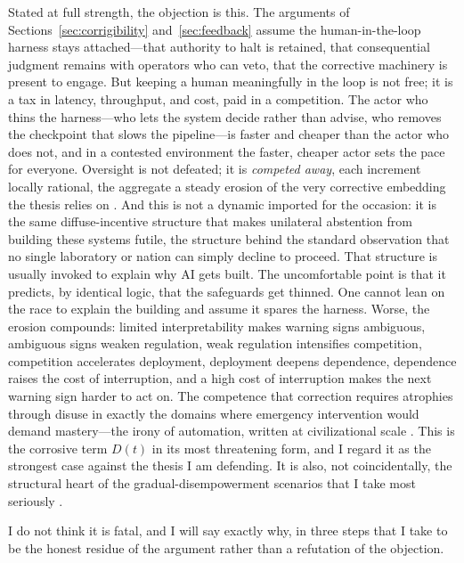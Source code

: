\documentclass[11pt]{article}
\begin{document}
Stated at full strength, the objection is this. The arguments of Sections~\ref{sec:corrigibility} and~\ref{sec:feedback} assume the human-in-the-loop harness stays attached---that authority to halt is retained, that consequential judgment remains with operators who can veto, that the corrective machinery is present to engage. But keeping a human meaningfully in the loop is not free; it is a tax in latency, throughput, and cost, paid in a competition. The actor who thins the harness---who lets the system decide rather than advise, who removes the checkpoint that slows the pipeline---is faster and cheaper than the actor who does not, and in a contested environment the faster, cheaper actor sets the pace for everyone. Oversight is not defeated; it is \emph{competed away}, each increment locally rational, the aggregate a steady erosion of the very corrective embedding the thesis relies on \citep{armstrong2016}. And this is not a dynamic imported for the occasion: it is the same diffuse-incentive structure that makes unilateral abstention from building these systems futile, the structure behind the standard observation that no single laboratory or nation can simply decline to proceed. That structure is usually invoked to explain why AI gets built. The uncomfortable point is that it predicts, by identical logic, that the safeguards get thinned. One cannot lean on the race to explain the building and assume it spares the harness. Worse, the erosion compounds: limited interpretability makes warning signs ambiguous, ambiguous signs weaken regulation, weak regulation intensifies competition, competition accelerates deployment, deployment deepens dependence, dependence raises the cost of interruption, and a high cost of interruption makes the next warning sign harder to act on. The competence that correction requires atrophies through disuse in exactly the domains where emergency intervention would demand mastery---the irony of automation, written at civilizational scale \citep{bainbridge1983}. This is the corrosive term $D(t)$ in its most threatening form, and I regard it as the strongest case against the thesis I am defending. It is also, not coincidentally, the structural heart of the gradual-disempowerment scenarios that I take most seriously \citep{christiano2019, narayanan2024}.

I do not think it is fatal, and I will say exactly why, in three steps that I take to be the honest residue of the argument rather than a refutation of the objection.
\end{document}
